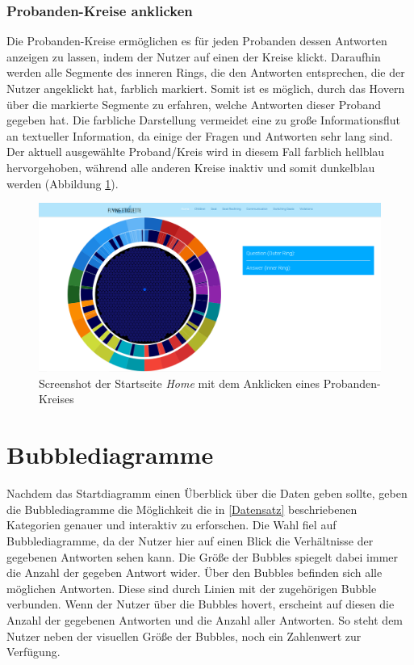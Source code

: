 \documentclass{mi-seminar}
\begin{document}
\subsubsection{Probanden-Kreise anklicken}
Die Probanden-Kreise ermöglichen es für jeden Probanden dessen Antworten anzeigen zu lassen, indem der Nutzer auf einen der Kreise klickt. Daraufhin werden alle Segmente des inneren Rings, die den Antworten entsprechen, die der Nutzer angeklickt hat, farblich markiert. Somit ist es möglich, durch das Hovern über die markierte Segmente zu erfahren, welche Antworten dieser Proband gegeben hat. Die farbliche Darstellung vermeidet eine zu große Informationsflut an textueller Information, da einige der Fragen und Antworten sehr lang sind. Der aktuell ausgewählte Proband/Kreis wird in diesem Fall farblich hellblau hervorgehoben, während alle anderen Kreise inaktiv und somit dunkelblau werden (Abbildung \ref{ScStartDiagramDotClick}).
\begin{figure}
\includegraphics[scale=0.3]{assets/start_click_participant_dot.png}
\caption{Screenshot der Startseite \textit{Home} mit dem Anklicken eines Probanden-Kreises}
\label{ScStartDiagramDotClick}
\end{figure}

\section{Bubblediagramme}
Nachdem das Startdiagramm einen Überblick über die Daten geben sollte, geben die Bubblediagramme die Möglichkeit die in \ref{Datensatz} beschriebenen Kategorien genauer und interaktiv zu erforschen.
Die Wahl fiel auf Bubblediagramme, da der Nutzer hier auf einen Blick die Verhältnisse der gegebenen Antworten sehen kann. Die Größe der Bubbles spiegelt dabei immer die Anzahl der gegeben Antwort wider. Über den Bubbles befinden sich alle möglichen Antworten. Diese sind durch Linien mit der zugehörigen Bubble verbunden. Wenn der Nutzer über die Bubbles hovert, erscheint auf diesen die Anzahl der gegebenen Antworten und die Anzahl aller Antworten. So steht dem Nutzer neben der visuellen Größe der Bubbles, noch ein Zahlenwert zur Verfügung. 
\end{document}
